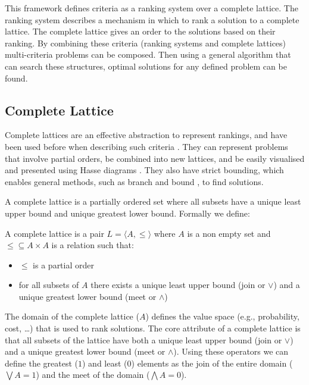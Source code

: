 
This framework defines criteria as a ranking system over a complete lattice.
The ranking system describes a mechanism in which to rank a solution to a complete lattice. 
The complete lattice gives an order to the solutions based on their ranking.
By combining these criteria (ranking systems and complete lattices) multi-criteria problems can be composed.
Then using a general algorithm that can search these structures, 
optimal solutions for any defined problem can be found.

\subsection{Complete Lattice}
Complete lattices are an effective abstraction to represent rankings,
and have been used before when describing such criteria \cite{Bistarelli1997,Fernandez}.
They can represent problems that involve partial orders,
be combined into new lattices,
and be easily visualised and presented using Hasse diagrams \cite{davey1990introduction}.
They also have strict bounding, which enables general methods, such as branch and bound \cite{Land1960}, to find solutions.

A complete lattice is a partially ordered set where all subsets have a unique least upper bound and unique greatest lower bound.
Formally we define:
\begin{defs}
A complete lattice is a pair $L = \langle A, \leq \rangle$ where $A$ is a non empty set 
and $\leq \subseteq A \times A$ is a relation such that:
\begin{itemize}
  \item $\leq$ is a partial order
  \item for all subsets of $A$ there exists a unique least upper bound (join or $\vee$) and a unique greatest lower bound (meet or $\wedge$)
\end{itemize}
\end{defs}

The domain of the complete lattice ($A$) defines the value space (e.g., probability, cost, \ldots) 
that is used to rank solutions. 
The core attribute of a complete lattice is that all subsets of the lattice have both a unique least upper bound (join or $\vee$) 
and a unique greatest lower bound (meet or $\wedge$).
Using these operators we can define the greatest ($1$) and least ($0$) elements as
the join of the entire domain ($\bigvee A = 1$) and the meet of the domain ($\bigwedge A = 0$).

